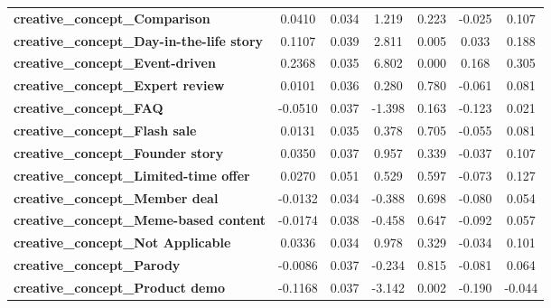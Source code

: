 \begin{center}
\begin{tabular}{lcccccc}
\textbf{creative\_concept\_Comparison}                          &       0.0410  &        0.034     &     1.219  &         0.223        &       -0.025    &        0.107     \\
\textbf{creative\_concept\_Day-in-the-life story}               &       0.1107  &        0.039     &     2.811  &         0.005        &        0.033    &        0.188     \\
\textbf{creative\_concept\_Event-driven}                        &       0.2368  &        0.035     &     6.802  &         0.000        &        0.168    &        0.305     \\
\textbf{creative\_concept\_Expert review}                       &       0.0101  &        0.036     &     0.280  &         0.780        &       -0.061    &        0.081     \\
\textbf{creative\_concept\_FAQ}                                 &      -0.0510  &        0.037     &    -1.398  &         0.163        &       -0.123    &        0.021     \\
\textbf{creative\_concept\_Flash sale}                          &       0.0131  &        0.035     &     0.378  &         0.705        &       -0.055    &        0.081     \\
\textbf{creative\_concept\_Founder story}                       &       0.0350  &        0.037     &     0.957  &         0.339        &       -0.037    &        0.107     \\
\textbf{creative\_concept\_Limited-time offer}                  &       0.0270  &        0.051     &     0.529  &         0.597        &       -0.073    &        0.127     \\
\textbf{creative\_concept\_Member deal}                         &      -0.0132  &        0.034     &    -0.388  &         0.698        &       -0.080    &        0.054     \\
\textbf{creative\_concept\_Meme-based content}                  &      -0.0174  &        0.038     &    -0.458  &         0.647        &       -0.092    &        0.057     \\
\textbf{creative\_concept\_Not Applicable}                      &       0.0336  &        0.034     &     0.978  &         0.329        &       -0.034    &        0.101     \\
\textbf{creative\_concept\_Parody}                              &      -0.0086  &        0.037     &    -0.234  &         0.815        &       -0.081    &        0.064     \\
\textbf{creative\_concept\_Product demo}                        &      -0.1168  &        0.037     &    -3.142  &         0.002        &       -0.190    &       -0.044     \\

\end{tabular}
\end{center}
